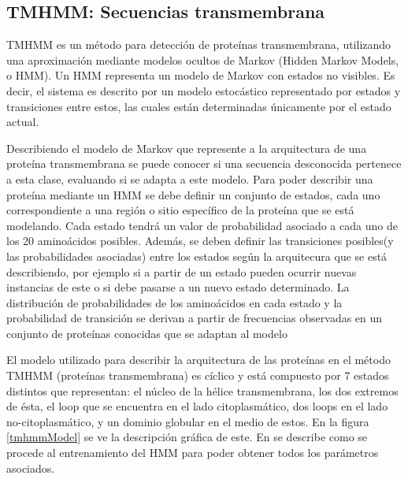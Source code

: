   
  
\subsection{TMHMM: Secuencias transmembrana} \label{tmhmm}
TMHMM\cite{krogh2001predicting} es un método para detección de proteínas transmembrana, utilizando una aproximación mediante modelos ocultos de Markov (Hidden Markov Models, o HMM).
Un HMM representa un modelo de Markov con estados no visibles. Es decir, el sistema es descrito por un modelo estocástico representado por estados y transiciones entre estos, las cuales están determinadas únicamente por el estado actual.

Describiendo el modelo de Markov que represente a la arquitectura de una proteína transmembrana se puede conocer si una secuencia desconocida pertenece a esta clase, evaluando si se adapta a este modelo.
Para poder describir una proteína mediante un HMM se debe definir un conjunto de estados, cada uno correspondiente a una región o sitio específico de la proteína que se está modelando.
Cada estado tendrá un valor de probabilidad asociado a cada uno de los 20 aminoácidos posibles. Además, se deben definir las transiciones posibles(y las probabilidades asociadas) entre los estados según la arquitecura que se está describiendo, por ejemplo si a partir 
de un estado pueden ocurrir nuevas instancias de este o si debe pasarse a un nuevo estado determinado.
La distribución de probabilidades de los aminoácidos en cada estado y la probabilidad de transición se derivan a partir de frecuencias observadas en un conjunto de proteínas conocidas que se adaptan al modelo

El modelo utilizado para describir la arquitectura de las proteínas en el método TMHMM (proteínas transmembrana) es cíclico y está compuesto por 7 estados distintos que representan: el núcleo de la hélice transmembrana, los dos extremos de ésta, 
el loop que se encuentra en el lado citoplasmático, dos loops en el lado no-citoplasmático, y un dominio globular en el medio de estos. En la figura \ref{tmhmmModel} se ve la descripción gráfica de este.
En \cite{sonnhammer1998hidden} se describe como se procede al entrenamiento del HMM para poder obtener todos los parámetros asociados.


